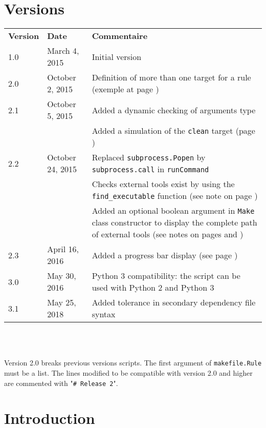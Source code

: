 \documentclass[a4paper,11pt]{extarticle}
\begin{document}
\section{Versions}
  \begin{tabular}{llp{10.5cm}}
    \textbf{Version} & \textbf{Date} & \textbf{Commentaire}\\
    1.0 & March 4, 2015 & Initial version \\
    2.0 & October 2, 2015 & Definition of more than one target for a rule (exemple at page \pageref{plusieursCibles})\\
    2.1 & October 5, 2015 & Added a dynamic checking of arguments type\\
        &                & Added a simulation of the \texttt{clean} target (page \pageref{simulationButClean})\\
    2.2 & October 24, 2015 & Replaced \texttt{subprocess.Popen} by \texttt{subprocess.call} in \texttt{runCommand}\\
        &                & Checks external tools exist by using the \texttt{find\_executable} function (see note on page \pageref{verifUtilitaire})\\
        &                & Added an optional boolean argument in \texttt{Make} class constructor to display the complete path of external tools (see notes on pages \pageref{logUtilityToolPath} and \pageref{logUtilityToolPath2})\\
    2.3 & April 16, 2016 & Added a progress bar display (see page \pageref{affichagePourcentage})\\
    3.0 & May 30, 2016 & Python 3 compatibility: the script can be used with Python 2 and Python 3\\
    3.1 & May 25, 2018 & Added tolerance in secondary dependency file syntax\\

  \end{tabular}
\\~

Version 2.0 breaks previous versions scripts. The first argument of \texttt{makefile.Rule} must be a list. The lines modified to be compatible with version 2.0 and higher are commented with "\texttt{\# Release 2}".


\section{Introduction}
\end{document}
